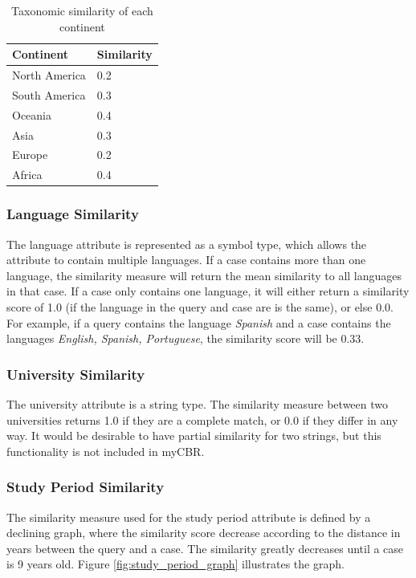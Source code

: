 \begin{table}[h]
\centering
\caption{Taxonomic similarity of each continent}
\label{tab:taxonomic_continent_similarity}
\begin{tabulary}{\textwidth}{|L|L|}
\hline
\textbf{Continent} & \textbf{Similarity} \\ \hline \hline
North America & 0.2 \\ \hline
South America & 0.3 \\ \hline
Oceania & 0.4 \\ \hline
Asia & 0.3 \\ \hline
Europe & 0.2 \\ \hline
Africa & 0.4 \\ \hline
\end{tabulary}
\end{table}
    
\subsubsection{Language Similarity} 

The language attribute is represented as a symbol type, which allows the attribute to contain multiple languages. If a case contains more than one language, the similarity measure will return the mean similarity to all languages in that case. If a case only contains one language, it will either return a similarity score of 1.0 (if the language in the query and case are is the same), or else 0.0. For example, if a query contains the language \textit{Spanish} and a case contains the languages \textit{English, Spanish, Portuguese}, the similarity score will be 0.33.
    
\subsubsection{University Similarity} 

The university attribute is a string type. The similarity measure between two universities returns 1.0 if they are a complete match, or 0.0 if they differ in any way. It would be desirable to have partial similarity for two strings, but this functionality is not included in myCBR.
    
\subsubsection{Study Period Similarity} 

The similarity measure used for the study period attribute is defined by a declining graph, where the similarity score decrease according to the distance in years between the query and a case. The similarity greatly decreases until a case is 9 years old. Figure \ref{fig:study_period_graph} illustrates the graph.
    
